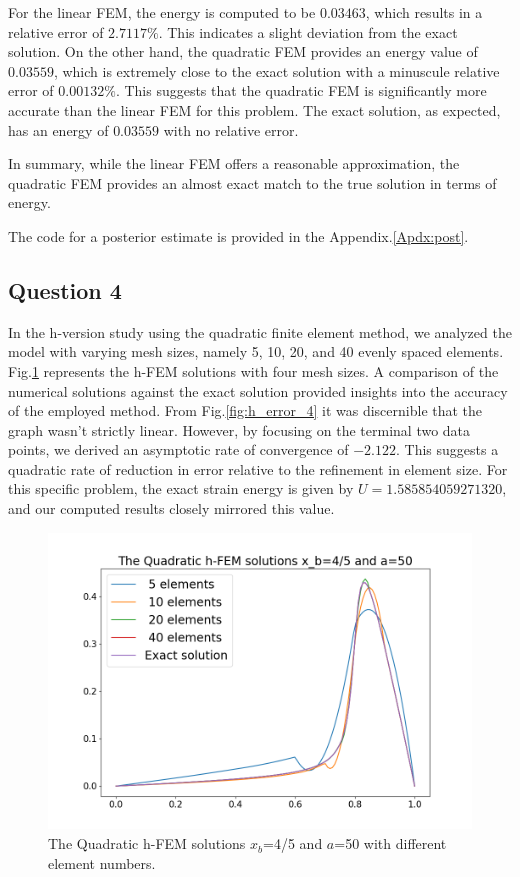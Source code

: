 \documentclass[twoside,twocolumn,10pt]{article}
\begin{document}
For the linear FEM, the energy is computed to be \(0.03463\), which results in a relative error of \(2.7117\%\). This indicates a slight deviation from the exact solution. On the other hand, the quadratic FEM provides an energy value of \(0.03559\), which is extremely close to the exact solution with a minuscule relative error of \(0.00132\%\). This suggests that the quadratic FEM is significantly more accurate than the linear FEM for this problem. The exact solution, as expected, has an energy of \(0.03559\) with no relative error.

In summary, while the linear FEM offers a reasonable approximation, the quadratic FEM provides an almost exact match to the true solution in terms of energy.

The code for a posterior estimate is provided in the Appendix.\ref{Apdx:post}.

\subsection{Question 4}
In the h-version study using the quadratic finite element method, we analyzed the model with varying mesh sizes, namely 5, 10, 20, and 40 evenly spaced elements. Fig.\ref{fig:q_4} represents the h-FEM solutions with four mesh sizes. A comparison of the numerical solutions against the exact solution provided insights into the accuracy of the employed method. From Fig.\ref{fig:h_error_4} it was discernible that the graph wasn't strictly linear. However, by focusing on the terminal two data points, we derived an asymptotic rate of convergence of \(-2.122\). This suggests a quadratic rate of reduction in error relative to the refinement in element size. For this specific problem, the exact strain energy is given by \( U = 1.585854059271320 \), and our computed results closely mirrored this value.  

\begin{figure}[!ht]
  \centering
  \includegraphics[width=1.\linewidth]{Q1/Q1_4.png}
  \caption{The Quadratic h-FEM solutions $x_b$=4/5 and $a$=50 with different element numbers.}
  \label{fig:q_4}
\end{figure}
\end{document}
